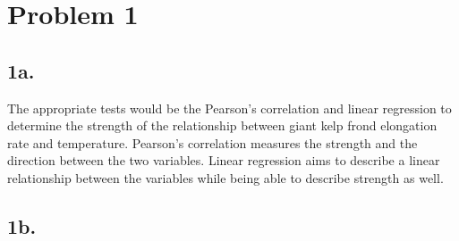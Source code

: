 \documentclass[
  letterpaper,
  DIV=11,
  numbers=noendperiod]{scrartcl}
\begin{document}
\section{Problem 1}\label{problem-1}

\subsection{1a.}\label{a.}

The appropriate tests would be the Pearson's correlation and linear
regression to determine the strength of the relationship between giant
kelp frond elongation rate and temperature. Pearson's correlation
measures the strength and the direction between the two variables.
Linear regression aims to describe a linear relationship between the
variables while being able to describe strength as well.

\subsection{1b.}\label{b.}
\end{document}
